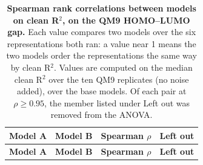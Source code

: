 
{\scriptsize
\begin{longtable}{llcc}
\caption{\textbf{\SuppFile{} Spearman rank correlations between models on clean R$^2$, on the QM9 HOMO--LUMO gap.}
Each value compares two models over the six representations both ran: a value near 1 means the two models order the representations the same way by clean R$^2$. Values are computed on the median clean R$^2$ over the ten QM9 replicates (no noise added), over the base models. Of each pair at $\rho \geq 0.95$, the member listed under Left out was removed from the ANOVA.}
\label{supp:model_redundancy}\\
\toprule
\textbf{Model A} & \textbf{Model B} & \textbf{Spearman $\rho$} & \textbf{Left out} \\
\midrule
\endfirsthead
\toprule
\textbf{Model A} & \textbf{Model B} & \textbf{Spearman $\rho$} & \textbf{Left out} \\
\midrule
\endhead

\bottomrule
\end{longtable}}
